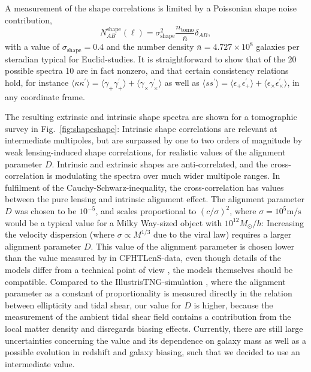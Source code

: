 \documentclass[a4paper,fleqn,usenatbib]{mnras}
\newcommand{\bra}{\langle}
\newcommand{\ket}{\rangle}
\begin{document}
A measurement of the shape correlations is limited by a Poissonian shape noise contribution,
\begin{equation}
N_{AB}^\mathrm{shape}(\ell) = \sigma^2_\mathrm{shape}\frac{n_\mathrm{tomo}}{\bar{n}}\delta_{AB},
\end{equation}
with a value of $\sigma_\mathrm{shape} = 0.4$ and the number density $\bar{n} = 4.727\times 10^8$ galaxies per steradian typical for Euclid-studies. It is straightforward to show that of the 20 possible spectra 10 are in fact nonzero, and that certain consistency relations hold, for instance $\bra\kappa\kappa^\prime\ket = \bra\gamma_+\gamma_+^\prime\ket + \bra\gamma_\times\gamma_\times^\prime\ket$ as well as $\bra ss^\prime\ket = \bra\epsilon_+\epsilon_+^\prime\ket + \bra\epsilon_\times\epsilon_\times^\prime\ket$, in any coordinate frame.

The resulting extrinsic and intrinsic shape spectra are shown for a tomographic survey in Fig.~\ref{fig:shapeshape}: Intrinsic shape correlations are relevant at intermediate multipoles, but are surpassed by one to two orders of magnitude by weak lensing-induced shape correlations, for realistic values of the alignment parameter $D$. Intrinsic and extrinsic shapes are anti-correlated, and the cross-correlation is modulating the spectra over much wider multipole ranges. In fulfilment of the Cauchy-Schwarz-inequality, the cross-correlation has values between the pure lensing and intrinsic alignment effect. The alignment parameter $D$ was chosen to be $10^{-5}$, and scales proportional to $(c/\sigma)^2$, where $\sigma=10^5\mathrm{m}/\mathrm{s}$ would be a typical value for a Milky Way-sized object with $10^{12} M_\odot/h$: Increasing the velocity dispersion (where $\sigma\propto M^{1/3}$ due to the viral law) requires a larger alignment parameter $D$. This value of the alignment parameter is chosen lower than the value measured by \citet{tugendhat_angular_2018} in CFHTLenS-data, even though details of the models differ from a technical point of view \citep[][who compute the correlations in real-space before Fourier-transforming into Fourier-space, whereas our model is set up entirely in Fourier-space]{tugendhat_angular_2018}, the models themselves should be compatible. Compared to the IllustrisTNG-simulation \citep{Zjupa_tng_2020}, where the alignment parameter as a constant of proportionality is measured directly in the relation between ellipticity and tidal shear, our value for $D$ is higher, because the measurement of the ambient tidal shear field contains a contribution from the local matter density and disregards biasing effects. Currently, there are still large uncertainties concerning the value and its dependence on galaxy mass as well as a possible evolution in redshift and galaxy biasing, such that we decided to use an intermediate value. 
\end{document}
